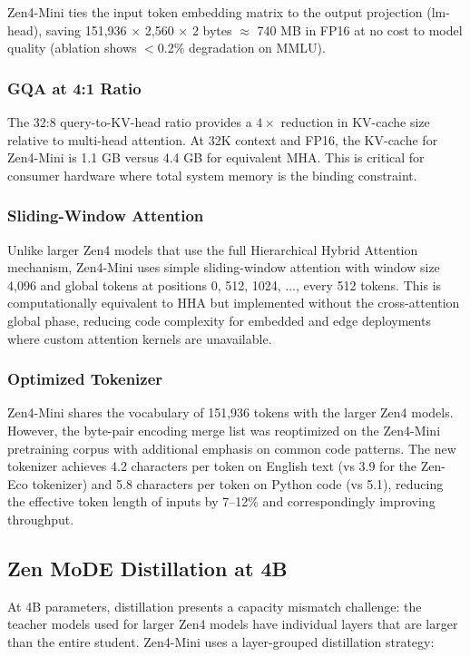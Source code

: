 \documentclass[11pt,a4paper]{article}
\begin{document}
Zen4-Mini ties the input token embedding matrix to the output projection (lm-head),
saving 151,936 $\times$ 2,560 $\times$ 2 bytes $\approx$ 740 MB in FP16 at no cost
to model quality (ablation shows $<$0.2\% degradation on MMLU).

\subsubsection{GQA at 4:1 Ratio}

The 32:8 query-to-KV-head ratio provides a $4\times$ reduction in KV-cache size relative
to multi-head attention. At 32K context and FP16, the KV-cache for Zen4-Mini is 1.1 GB
versus 4.4 GB for equivalent MHA. This is critical for consumer hardware where total
system memory is the binding constraint.

\subsubsection{Sliding-Window Attention}

Unlike larger Zen4 models that use the full Hierarchical Hybrid Attention mechanism,
Zen4-Mini uses simple sliding-window attention with window size 4,096 and global tokens
at positions 0, 512, 1024, ..., every 512 tokens. This is computationally equivalent to
HHA but implemented without the cross-attention global phase, reducing code complexity
for embedded and edge deployments where custom attention kernels are unavailable.

\subsubsection{Optimized Tokenizer}

Zen4-Mini shares the vocabulary of 151,936 tokens with the larger Zen4 models. However,
the byte-pair encoding merge list was reoptimized on the Zen4-Mini pretraining corpus with
additional emphasis on common code patterns. The new tokenizer achieves 4.2 characters
per token on English text (vs 3.9 for the Zen-Eco tokenizer) and 5.8 characters per token
on Python code (vs 5.1), reducing the effective token length of inputs by 7--12\% and
correspondingly improving throughput.

\subsection{Zen MoDE Distillation at 4B}

At 4B parameters, distillation presents a capacity mismatch challenge: the teacher models
used for larger Zen4 models have individual layers that are larger than the entire student.
Zen4-Mini uses a layer-grouped distillation strategy:
\end{document}
